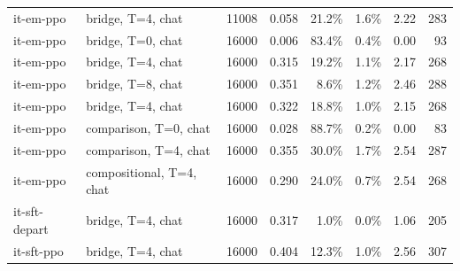 \begin{tabular}{llrrrrrr}
it-em-ppo & bridge, T=4, chat & 11008 & 0.058 & 21.2\% & 1.6\% & 2.22 & 283 \\
it-em-ppo & bridge, T=0, chat & 16000 & 0.006 & 83.4\% & 0.4\% & 0.00 & 93 \\
it-em-ppo & bridge, T=4, chat & 16000 & 0.315 & 19.2\% & 1.1\% & 2.17 & 268 \\
it-em-ppo & bridge, T=8, chat & 16000 & 0.351 & 8.6\% & 1.2\% & 2.46 & 288 \\
it-em-ppo & bridge, T=4, chat & 16000 & 0.322 & 18.8\% & 1.0\% & 2.15 & 268 \\
it-em-ppo & comparison, T=0, chat & 16000 & 0.028 & 88.7\% & 0.2\% & 0.00 & 83 \\
it-em-ppo & comparison, T=4, chat & 16000 & 0.355 & 30.0\% & 1.7\% & 2.54 & 287 \\
it-em-ppo & compositional, T=4, chat & 16000 & 0.290 & 24.0\% & 0.7\% & 2.54 & 268 \\
it-sft-depart & bridge, T=4, chat & 16000 & 0.317 & 1.0\% & 0.0\% & 1.06 & 205 \\
it-sft-ppo & bridge, T=4, chat & 16000 & 0.404 & 12.3\% & 1.0\% & 2.56 & 307 \\
\bottomrule
\end{tabular}
